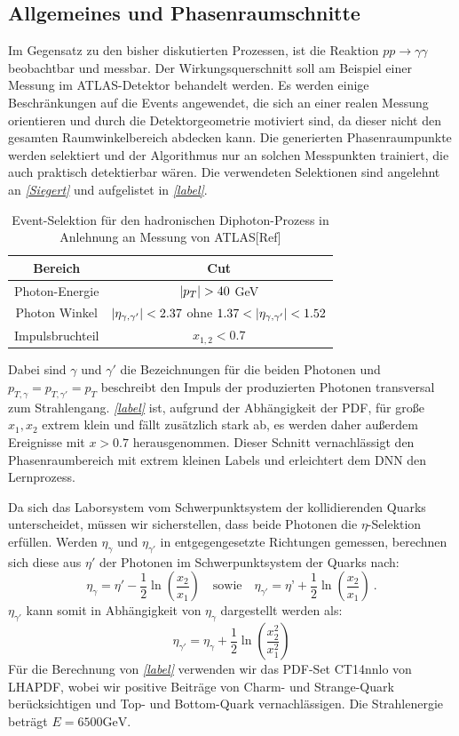 \subsection{Allgemeines und Phasenraumschnitte}
Im Gegensatz zu den bisher diskutierten Prozessen, ist die Reaktion $pp \rightarrow \gamma \gamma$ beobachtbar und messbar. Der Wirkungsquerschnitt soll am Beispiel einer Messung im ATLAS-Detektor behandelt werden. Es werden einige Beschränkungen auf die Events angewendet, die sich an einer realen Messung orientieren und durch die Detektorgeometrie motiviert sind, da dieser nicht den gesamten Raumwinkelbereich abdecken kann. Die generierten Phasenraumpunkte werden selektiert und der Algorithmus nur an solchen Messpunkten trainiert, die auch praktisch detektierbar wären. Die verwendeten Selektionen sind angelehnt an \textit{\autoref{Siegert}} und aufgelistet in \textit{\autoref{label}}.
\begin{table}[bp]
	\centering
	\begin{tabular}{|c|c|}
		\hline
		Bereich & Cut \\
		\hline
		Photon-Energie & $\abs{p_T} > 40$ GeV \\
		Photon Winkel & $\abs{\eta_{\gamma, \gamma'}} < 2.37$ ohne $1.37 < \abs{\eta_{\gamma, \gamma'}} < 1.52$ \\
		Impulsbruchteil & $x_{1,2} < 0.7 $\\
		\hline
	\end{tabular}
	\caption{Event-Selektion für den hadronischen Diphoton-Prozess in Anlehnung an Messung von ATLAS[Ref]} %
\end{table}
Dabei sind $\gamma$ und ${\gamma'}$ die Bezeichnungen für die beiden Photonen und $p_{T,\gamma} = p_{T,\gamma'} = p_T$ beschreibt den Impuls der produzierten Photonen transversal zum Strahlengang. \textit{\autoref{label}} ist, aufgrund der Abhängigkeit der PDF, für große $x_1, x_2$ extrem klein und fällt zusätzlich stark ab, es werden daher außerdem Ereignisse mit $x > 0.7$ herausgenommen. Dieser Schnitt vernachlässigt den Phasenraumbereich mit extrem kleinen Labels und erleichtert dem DNN den Lernprozess. 

Da sich das Laborsystem vom Schwerpunktsystem der kollidierenden Quarks unterscheidet, müssen wir sicherstellen, dass beide Photonen die $\eta$-Selektion erfüllen. Werden $\eta_{\gamma}$ und $\eta_{\gamma'}$ in entgegengesetzte Richtungen gemessen, berechnen sich diese aus $\eta'$ der Photonen im Schwerpunktsystem der Quarks nach: 
\begin{equation}
\eta_{\gamma} = \eta' -\frac{1}{2}\ln(\frac{x_2}{x_1}) \quad \text{sowie} \quad \eta_{\gamma'} = \eta’ + \frac{1}{2}\ln(\frac{x_2}{x_1})~.
\end{equation}
$\eta_{\gamma'}$ kann somit in Abhängigkeit von $\eta_{\gamma}$ dargestellt werden als:
\begin{equation} 
\eta_{\gamma'} = \eta_{\gamma} + \frac{1}{2}  \ln(\frac{x_2^2}{x_1^2})
\end{equation}
Für die Berechnung von \textit{\autoref{label}} verwenden wir das PDF-Set CT14nnlo von LHAPDF, wobei wir positive Beiträge von Charm- und Strange-Quark berücksichtigen und Top- und Bottom-Quark vernachlässigen. Die Strahlenergie beträgt $E = 6500 \text{GeV}$.
